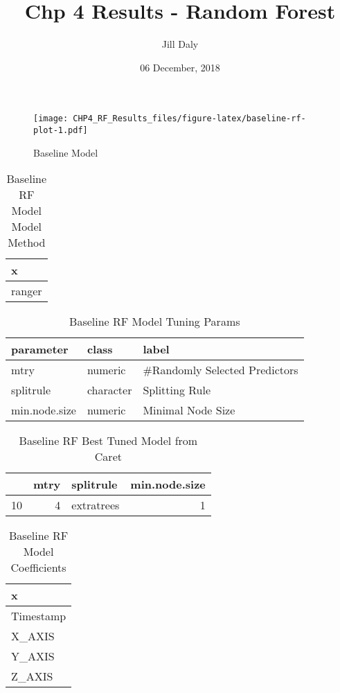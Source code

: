 \documentclass[]{article}
\title{Chp 4 Results - Random Forest}
\author{Jill Daly}
\date{06 December, 2018}
\begin{document}
\maketitle

\begin{figure}
\centering
\texttt{[image: CHP4\_RF\_Results\_files/figure-latex/baseline-rf-plot-1.pdf]}
\caption{Baseline Model}
\end{figure}

\begin{table}[!h]

\caption{\label{tab:baseline-rf-params}Baseline RF Model Model Method}
\centering
\begin{tabular}[t]{l}
\toprule
x\\
\midrule
ranger\\
\bottomrule
\end{tabular}
\end{table}

\begin{table}[!h]

\caption{\label{tab:baseline-rf-params}Baseline RF Model Tuning Params}
\centering
\begin{tabular}[t]{lll}
\toprule
parameter & class & label\\
\midrule
mtry & numeric & \#Randomly Selected Predictors\\
splitrule & character & Splitting Rule\\
min.node.size & numeric & Minimal Node Size\\
\bottomrule
\end{tabular}
\end{table}

\begin{table}[!h]

\caption{\label{tab:baseline-rf-params}Baseline RF Best Tuned Model from Caret}
\centering
\begin{tabular}[t]{lrlr}
\toprule
  & mtry & splitrule & min.node.size\\
\midrule
10 & 4 & extratrees & 1\\
\bottomrule
\end{tabular}
\end{table}

\begin{table}[!h]

\caption{\label{tab:baseline-rf-params}Baseline RF Model Coefficients}
\centering
\begin{tabular}[t]{l}
\toprule
x\\
\midrule
Timestamp\\
X\_AXIS\\
Y\_AXIS\\
Z\_AXIS\\
\bottomrule
\end{tabular}
\end{table}
\end{document}

